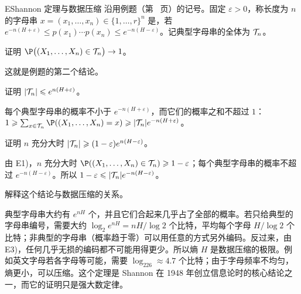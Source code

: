 
\begin{probleme}{E}{Shannon 定理与数据压缩}
沿用例题（第~\pageref{we:strong-laws:shannon} 页）的记号。固定 $\varepsilon>0$，称长度为 $n$ 的字母串 $x=(x_1,\dots,x_n)\in\{1,\dots,r\}^n$ 是，若 $e^{-n(H+\varepsilon)}\leqslant p(x_1)\cdots p(x_n)\leqslant e^{-n(H-\varepsilon)}$。记典型字母串的全体为 $\mathcal{T}_n$。
\begin{questions}
\item 证明 $\P\bigl((X_1,\dots,X_n)\in\cT_n\bigr)\to1$。
\begin{solution}
这就是例题的第二个结论。
\end{solution}
\item 证明 $\lvert \mathcal{T}_n\rvert\leqslant e^{n(H+\varepsilon)}$。
\begin{solution}
每个典型字母串的概率不小于 $e^{-n(H+\varepsilon)}$，而它们的概率之和不超过 $1$：$1\geqslant\sum_{x\in\cT_n}\P((X_1,\dots,X_n)=x)\geqslant\abs{\cT_n}e^{-n(H+\varepsilon)}$。
\end{solution}
\item 证明 $n$ 充分大时 $\lvert \mathcal{T}_n\rvert\geqslant(1-\varepsilon)e^{n(H-\varepsilon)}$。
\begin{solution}
由 E1)，$n$ 充分大时 $\P((X_1,\dots,X_n)\in\cT_n)\geqslant1-\varepsilon$；每个典型字母串的概率不超过 $e^{-n(H-\varepsilon)}$。所以 $1-\varepsilon\leqslant\lvert \mathcal{T}_n\rvert e^{-n(H-\varepsilon)}$。
\end{solution}
\item 解释这个结论与数据压缩的关系。
\begin{solution}
典型字母串大约有 $e^{nH}$ 个，并且它们合起来几乎占了全部的概率。若只给典型的字母串编号，需要大约 $\log_2e^{nH}=nH/\log2$ 个比特，平均每个字母 $H/\log2$ 个比特；非典型的字母串（概率趋于零）可以用任意的方式另外编码。反过来，由 E3)，任何几乎无损的编码都不可能用得更少。所以熵 $H$ 是数据压缩的极限。例如英文字母若各字母等可能，需要 $\log_226\approx4.7$ 个比特；由于字母频率不均匀，熵更小，可以压缩。这个定理是 Shannon 在 1948 年创立信息论时的核心结论之一，而它的证明只是强大数定律。
\end{solution}
\end{questions}
\end{probleme}
